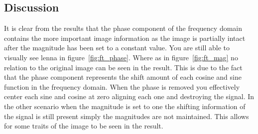 \documentclass[letter]{article}
\begin{document}
\subsection{Discussion}
It is clear from the results that the phase component of the frequency domain contains the more important image information as the image is partially intact after the magnitude has been set to a constant value. You are still able to visually see lenna in figure~\ref{fig:ft_phase}. Where as in figure~\ref{fig:ft_mag} no relation to the original image can be seen in the result. This is due to the fact that the phase component represents the shift amount of each cosine and sine function in the frequency domain. When the phase is removed you effectively center each sine and cosine at zero aligning each one and destroying the signal. In the other scenario when the magnitude is set to one the shifting information of the signal is still present simply the magnitudes are not maintained. This allows for some traits of the image to be seen in the result.
\end{document}
